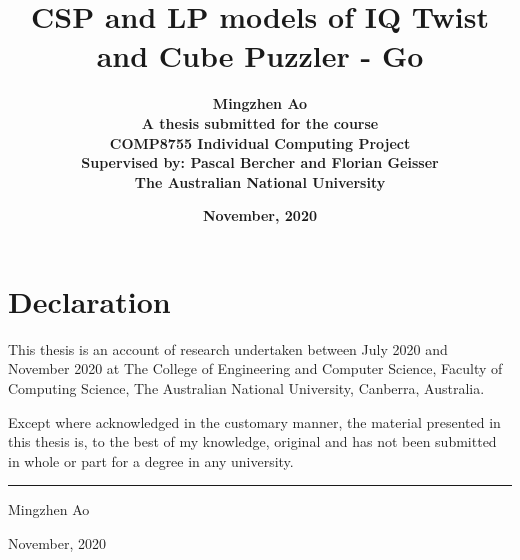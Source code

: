 \documentclass[11pt,a4paper]{scrartcl}
\begin{document}

\begin{titlepage}
\title{\textbf{CSP and LP models of IQ Twist and Cube Puzzler - Go}\\[2cm]}
 \author{\textbf{Mingzhen Ao}\\[6cm]
 \textbf{A thesis submitted for the course}\\
 \textbf{COMP8755 Individual Computing Project} \\
 \textbf{Supervised by: Pascal Bercher and Florian Geisser}\\
 \textbf{The Australian National University}\\[1cm]}
 \date{\textbf{November, 2020}}
\maketitle
 \end{titlepage}
 
 \sloppy
 
\chapter*{Declaration}

This thesis is an account of research undertaken between July 2020 and 
November 2020 at The College of Engineering and Computer Science, Faculty of Computing Science, The Australian National University, Canberra, Australia.

Except where acknowledged in the customary manner, the material 
presented in this thesis is, to the best of my knowledge, original and 
has not been submitted in whole or part for a degree in any 
university.

\vspace{20mm}  %

\hspace{80mm}\rule{40mm}{.15mm}\par   %
\hspace{80mm} Mingzhen Ao\par
\hspace{80mm} November, 2020




\tableofcontents


\setcounter{page}{1}  %




\end{document}
